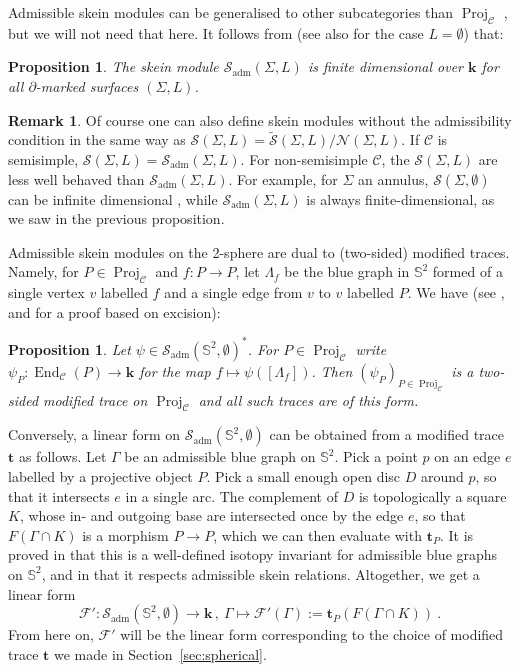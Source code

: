 \documentclass[11pt]{amsart}
\newtheorem{prop}[thm]{Proposition}
\theoremstyle{definition}
\newtheorem{remark}[thm]{Remark}
\numberwithin{equation}{section}
\def\bd{{\partial}}
\def\mtr{{\mathbf{t}}} %
\newcommand{\Proj}{\operatorname{Proj}}
\def\adm{\operatorname{adm}}
\def\cgpt{\mathscr{F}}
\def\sk{\cS}
\def\cC{\mathcal{C}}
\def\cS{\mathcal{S}}
\def\bS{{\mathbb{S}}}
\def\kk{{\bm{k}}}
\def\to{\rightarrow}
\def\End{{\operatorname{End}}}
\begin{document}
Admissible skein modules can be generalised to other subcategories than $\Proj_{\cC}$ \cite{CGP23,RST24}, but we will not need that here.
It follows from \cite[Prop.\,5.6]{RST24} (see also \cite[Thm.\,2.3]{CGP23} for the case $L=\emptyset$) that: 

\begin{prop}\label{prop:finite-1}
The skein module $\sk_{\adm}(\Sigma, L)$ is finite dimensional over $\kk$ for all $\bd$-marked surfaces $(\Sigma, L)$.
\end{prop}

\begin{remark}
Of course one can also define skein modules without the admissibility condition in the same way as $\sk(\Sigma,L) = \tilde{\sk}(\Sigma,L) / \mathcal{N}(\Sigma,L)$. If $\cC$ is semisimple, $\sk(\Sigma,L)= \sk_{\adm}(\Sigma,L)$. For non-semisimple $\cC$, the $\sk(\Sigma,L)$ are less well behaved than $\sk_{\adm}(\Sigma,L)$. For example, for $\Sigma$ an annulus, $\sk(\Sigma,\emptyset)$ can be infinite dimensional \cite[Rem.\,5.10]{RST24}, while $\sk_{\adm}(\Sigma,L)$ is always finite-dimensional, as we saw in the previous proposition. 
\end{remark}

Admissible skein modules on the 2-sphere are dual to (two-sided) modified traces. Namely, for $P \in \Proj_\cC$ and $f : P \to P$, let $\Lambda_f$ be the blue graph in $\bS^2$ formed of a single vertex $v$ labelled $f$ and a single edge from $v$ to $v$ labelled $P$. We have (see \cite[Thm.\,2.4]{CGPV23}, and \cite[Prop.\,5.5]{RST24} for a proof based on excision):

\begin{prop}\label{prop:mod-tr-and-skein}
Let $\psi \in \sk_{\adm}(\bS^2, \emptyset)^*$. For $P \in \Proj_{\cC}$ write $\psi_P : \End_{\cC}(P) \to \kk$ for the map $f \mapsto \psi([\Lambda_f])$. Then $(\psi_P)_{P \in \Proj_{\cC}}$ is a two-sided modified trace on $\Proj_{\cC}$ and all such traces are of this form.
\end{prop}

Conversely, a linear form on $\sk_{\adm}(\bS^2, \emptyset)$ can be obtained from a modified trace $\mtr$ as follows. 
Let $\Gamma$ be an admissible blue graph on $\bS^2$. Pick a point $p$ on an edge $e$ labelled by a projective object $P$. Pick a small enough open disc $D$ around $p$, so that it intersects $e$ in a single arc. The complement of $D$ is topologically a square $K$, whose in- and outgoing base are intersected once by the edge $e$, so that $F(\Gamma \cap K)$ is a morphism $P \to P$, which we can then evaluate with $\mtr_P$.
It is proved in \cite[Thm.\ 5]{GPV13} that this is a well-defined isotopy invariant for admissible blue graphs on $\bS^2$, and in \cite[Thm.\,2.4]{CGPV23} that it respects admissible skein relations. Altogether, we get a linear form
\begin{equation}\label{eq:sph-inv}
\cgpt': \sk_{\adm}(\bS^2, \emptyset) \to \kk\,,\ \Gamma \mapsto \cgpt'(\Gamma) := \mtr_P(F(\Gamma \cap K)) \ .
\end{equation}
From here on, $\cgpt'$ will be the linear form corresponding to the choice of modified trace $\mtr$ we made in Section~\ref{sec:spherical}.
\end{document}

